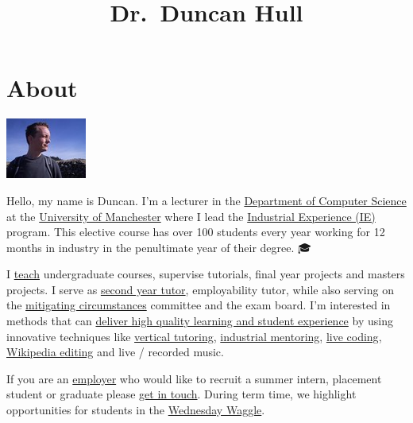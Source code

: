 \documentclass[12pt,]{book}
\title{Dr.~Duncan Hull}
\author{}
\date{}
\begin{document}
\maketitle

{
\setcounter{tocdepth}{1}
\tableofcontents
}
\hypertarget{about}{%
\chapter*{About}\label{about}}

\begin{center}\includegraphics[width=0.4\linewidth]{images/me-blue} \end{center}

Hello, my name is Duncan. I'm a lecturer in the \href{https://www.cs.manchester.ac.uk/}{Department of Computer Science} at the \href{https://www.manchester.ac.uk}{University of Manchester} where I lead the \href{https://www.cs.manchester.ac.uk/study/undergraduate/industrial-experience/}{Industrial Experience (IE)} program. This elective course has over 100 students every year working for 12 months in industry in the penultimate year of their degree. 🎓

I \protect\hyperlink{teaching}{teach} undergraduate courses, supervise tutorials, final year projects and masters projects. I serve as \href{http://studentnet.cs.manchester.ac.uk/ugt/year2/}{second year tutor}, employability tutor, while also serving on the \href{http://www.studentsupport.manchester.ac.uk/study-support/mitigating-circumstances/}{mitigating circumstances} committee and the exam board. I'm interested in methods that can \protect\hyperlink{research}{deliver high quality learning and student experience} by using innovative techniques like \protect\hyperlink{vertical-tutoring-1}{vertical tutoring}, \href{https://www.cs.manchester.ac.uk/connect/business-engagement/industrial-mentoring/}{industrial mentoring}, \href{https://en.wikipedia.org/wiki/Live_coding}{live coding}, \protect\hyperlink{wikipedia}{Wikipedia editing} and live / recorded music. 🎸

If you are an \protect\hyperlink{employers}{employer} who would like to recruit a summer intern, placement student or graduate please \protect\hyperlink{contact}{get in touch}. During term time, we highlight opportunities for students in the \href{https://waggle.cs.manchester.ac.uk/waggle/about}{Wednesday Waggle}. 🐝
\end{document}
